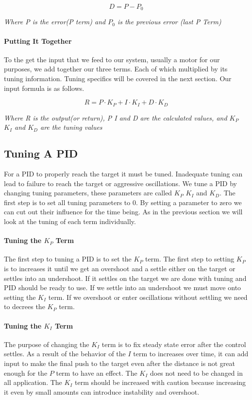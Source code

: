 \documentclass[12pt]{article}
\begin{document}
    $$D = P - P_0$$
    \begin{center}\em{Where P is the error(P term) and $P_0$ is the previous error (last P Term)}\end{center}

\paragraph{Putting It Together}
    To the get the input that we feed to our system, usually a motor for our purposes, we add together our three terms. Each of which multiplied by its tuning information. Tuning specifics will be covered in the next section. Our input formula is as follows.

    $$ R = P \cdot K_P + I \cdot K_I + D \cdot K_D$$
    \begin{center}
        \em{Where R is the output(or return), P I and D are the calculated values, and $K_P$ $K_I$ and $K_D$ are the tuning values}
    \end{center}

\subsection{Tuning A PID}
    For a PID to properly reach the target it must be tuned. Inadequate tuning can lead to failure to reach the target or aggressive oscillations. We tune a PID by changing tuning parameters, these parameters are called $K_P$ $K_I$ and $K_D$. The first step is to set all tuning parameters to 0. By setting a parameter to zero we can cut out their influence for the time being. As in the previous section we will look at the tuning of each term individually.

\paragraph{Tuning the $K_P$ Term}
    The first step to tuning a PID is to set the $K_P$ term. The first step to setting $K_P$ is to increases it until we get an overshoot and a settle either on the target or settles into an undershoot. If it settles on the target we are done with tuning and PID should be ready to use. If we settle into an undershoot we must move onto setting the $K_I$ term. If we overshoot or enter oscillations without settling we need to decrees the $K_P$ term.

\paragraph{Tuning the $K_I$ Term}
    The purpose of changing the $K_I$ term is to fix steady state error after the control settles. As a result of the behavior of the $I$ term to increases over time, it can add input to make the final push to the target even after the distance is not great enough for the $P$ term to have an effect. The $K_I$ does not need to be changed in all application. The $K_I$ term should be increased with caution because increasing it even by small amounts can introduce instability and overshoot.
\end{document}
